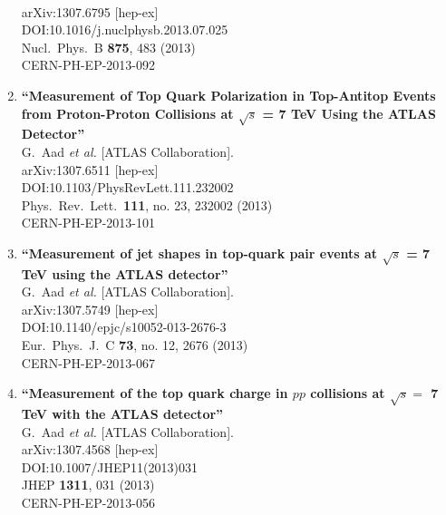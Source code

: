 \documentclass{article}
\begin{document}
\begin{enumerate}
  \\{}arXiv:1307.6795 [hep-ex]
  \\{}DOI:10.1016/j.nuclphysb.2013.07.025
  \\{}Nucl.\ Phys.\ B {\bf 875}, 483 (2013)
  \\{}CERN-PH-EP-2013-092
\item%
{\bf ``Measurement of Top Quark Polarization in Top-Antitop Events from Proton-Proton Collisions at $\sqrt{s}$ = 7  TeV Using the ATLAS Detector''}
  \\{}G.~Aad {\it et al.} [ATLAS Collaboration].
  \\{}arXiv:1307.6511 [hep-ex]
  \\{}DOI:10.1103/PhysRevLett.111.232002
  \\{}Phys.\ Rev.\ Lett.\  {\bf 111}, no. 23, 232002 (2013)
  \\{}CERN-PH-EP-2013-101
\item%
{\bf ``Measurement of jet shapes in top-quark pair events at $\sqrt{s}$ = 7 TeV using the ATLAS detector''}
  \\{}G.~Aad {\it et al.} [ATLAS Collaboration].
  \\{}arXiv:1307.5749 [hep-ex]
  \\{}DOI:10.1140/epjc/s10052-013-2676-3
  \\{}Eur.\ Phys.\ J.\ C {\bf 73}, no. 12, 2676 (2013)
  \\{}CERN-PH-EP-2013-067
\item%
{\bf ``Measurement of the top quark charge in $pp$ collisions at $\sqrt{s} =$ 7 TeV with the ATLAS detector''}
  \\{}G.~Aad {\it et al.} [ATLAS Collaboration].
  \\{}arXiv:1307.4568 [hep-ex]
  \\{}DOI:10.1007/JHEP11(2013)031
  \\{}JHEP {\bf 1311}, 031 (2013)
  \\{}CERN-PH-EP-2013-056

\end{enumerate}
\end{document}
